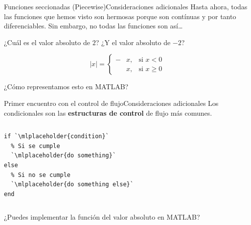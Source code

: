 \documentclass[spanish, c]{beamer}
\begin{document}
\begin{frame}{Funciones seccionadas (Piecewise)}{Consideraciones adicionales}
    Hasta ahora, todas las funciones que hemos visto son hermosas porque son contínuas y por tanto diferenciables.
    Sin embargo, no todas las funciones son así\dots \pause

    \bigskip

    ¿Cuál es el valor absoluto de $2$? \pause ¿Y el valor absoluto de $-2$? \pause

    $$|x| =\left\{ \begin{aligned}
        -&x , &\text{si } x < 0 \\
        &x ,  & \text{si } x \ge 0
    \end{aligned} \right.
    $$ \pause
    
    \bigskip

    ¿Cómo representamos esto en MATLAB?
\end{frame}

\begin{frame}[fragile]{Primer encuentro con el control de flujo}{Consideraciones adicionales}
    Los \alert{condicionales} son las \textbf{estructuras de control} de flujo más comunes.

    \bigskip

    \begin{columns}
        \begin{column}{0.95\linewidth}
\begin{lstlisting}
if `\mlplaceholder{condition}`
  % Si se cumple
  `\mlplaceholder{do something}`
else
  % Si no se cumple
  `\mlplaceholder{do something else}`
end
\end{lstlisting}
        \end{column}
        
    \end{columns}

\bigskip

¿Puedes implementar la función del valor absoluto en MATLAB?
\end{frame}




\end{document}
